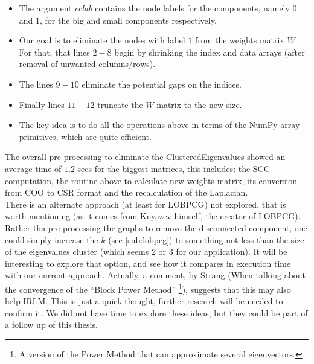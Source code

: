 \begin{itemize}
  \item The argument \emph{cclab} contains the node labels for the
    components, namely $0$ and $1$, for the big and small components
    respectively. \\
  \item  Our goal is to eliminate the nodes with label $1$ from the
    weights matrix $W$. For that, that lines $2-8$ begin by shrinking
    the index and data arrays (after removal of unwanted
    columns/rows). \\
  \item The lines $9-10$ eliminate the potential gaps on the
    indices. \\
  \item Finally lines $11-12$ truncate the $W$ matrix to the new
    size. \\
  \item The key idea is to do all the operations above in terms of the
    NumPy \cite{numpy} array primitives, which are quite efficient. \\
\end{itemize}

The overall pre-processing to eliminate the \gls{ClusteredEigenvalues} 
showed an average time of $1.2$ secs for the biggest
matrices, this includes: the \gls{SCC} computation, the routine above
to calculate new weights matrix, its conversion from COO
to CSR format and the recalculation of the \gls{Laplacian}. \\

There is an alternate approach (at least for \gls{LOBPCG}) not
explored, that is worth mentioning (as it comes from Knyazev 
himself, the creator of \gls{LOBPCG}). Rather tha pre-processing the
graphs to remove the disconnected component, one could simply
increase the $k$ (see \cref{sub:lobpcg}) to something not less than
the size of the eigenvalues cluster (which  
seems 2 or 3 for our application). It will be interesting to 
explore that option, and see how it compares in execution time
with our current approach. Actually, a comment, by Strang 
\cite{strang88} (When talking about the convergence of the ``Block
Power Method'' \footnote{A version of the Power Method that can
  approximate several eigenvectors.}), suggests that this may
also help \gls{IRLM}. This is 
just a quick thought, further research will be needed to confirm
it. We did not have time to explore these ideas, but they could be part of
a follow up of this thesis.

